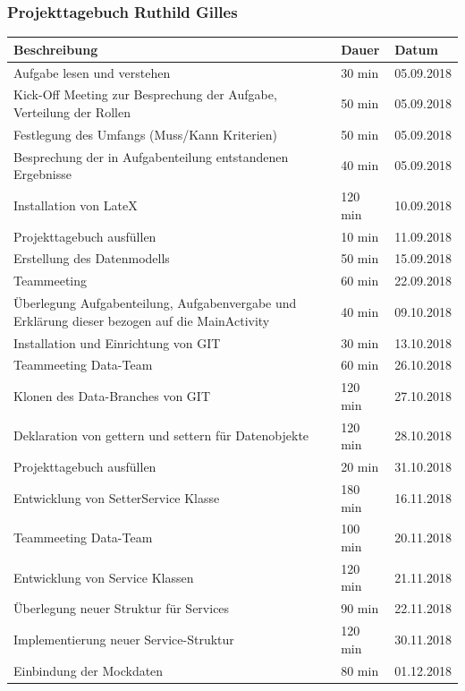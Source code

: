 \newpage
\subsubsection{Projekttagebuch Ruthild Gilles}
\begin{longtable}{|p{10cm}|p{2cm}|p{2cm}|}
\hline
{\textbf{Beschreibung}} & {\textbf{Dauer}} & {\textbf{Datum}} \\ \hline
Aufgabe lesen und verstehen & 30 min & 05.09.2018 \\ \hline
Kick-Off Meeting zur Besprechung der Aufgabe, Verteilung der Rollen & 50 min & 05.09.2018 \\ \hline
Festlegung des Umfangs (Muss/Kann Kriterien) & 50 min & 05.09.2018 \\ \hline
Besprechung der in Aufgabenteilung entstandenen Ergebnisse & 40 min & 05.09.2018 \\ \hline
Installation von LateX & 120 min & 10.09.2018 \\ \hline
Projekttagebuch ausfüllen & 10 min & 11.09.2018 \\ \hline
Erstellung des Datenmodells & 50 min & 15.09.2018 \\ \hline
Teammeeting & 60 min & 22.09.2018 \\ \hline
Überlegung Aufgabenteilung, Aufgabenvergabe und Erklärung dieser bezogen auf die MainActivity & 40 min & 09.10.2018 \\ \hline
Installation und Einrichtung von GIT & 30 min & 13.10.2018 \\ \hline
Teammeeting Data-Team &  60 min & 26.10.2018 \\ \hline
Klonen des Data-Branches von GIT & 120 min & 27.10.2018 \\ \hline
Deklaration von gettern und settern für Datenobjekte & 120 min & 28.10.2018 \\ \hline
Projekttagebuch ausfüllen & 20 min & 31.10.2018 \\ \hline
Entwicklung von SetterService Klasse & 180 min & 16.11.2018 \\ \hline
Teammeeting Data-Team & 100 min & 20.11.2018 \\ \hline
Entwicklung von Service Klassen & 120 min & 21.11.2018 \\ \hline
Überlegung neuer Struktur für Services & 90 min & 22.11.2018 \\ \hline
Implementierung neuer Service-Struktur & 120 min & 30.11.2018 \\ \hline
Einbindung der Mockdaten & 80 min & 01.12.2018 \\ \hline

\end{longtable}
